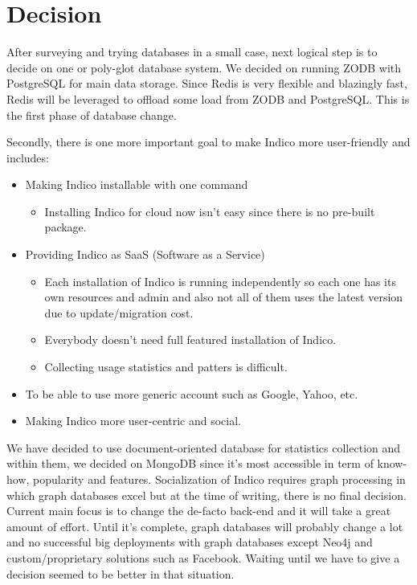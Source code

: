\chapter{Decision}

After surveying and trying databases in a small case, next logical step is to decide on one or poly-glot database system. We decided on running ZODB with PostgreSQL for main data storage. Since Redis is very flexible and blazingly fast, Redis will be leveraged to offload some load from ZODB and PostgreSQL. This is the first phase of database change.

Secondly, there is one more important goal to make Indico more user-friendly and includes:
\begin{itemize}
  \item Making Indico installable with one command
  \begin{itemize}
    \item Installing Indico for cloud now isn't easy since there is no pre-built package.
  \end{itemize}
  \item Providing Indico as SaaS (Software as a Service)
  \begin{itemize}
    \item Each installation of Indico is running independently so each one has its own resources and admin and also not all of them uses the latest version due to update/migration cost.
    \item Everybody doesn't need full featured installation of Indico.
    \item Collecting usage statistics and patters is difficult.
  \end{itemize}
  \item To be able to use more generic account such as Google, Yahoo, etc.
  \item Making Indico more user-centric and social.
\end{itemize}

We have decided to use document-oriented database for statistics collection and within them, we decided on MongoDB since it's most accessible in term of know-how, popularity and features. Socialization of Indico requires graph processing in which graph databases excel but at the time of writing, there is no final decision. Current main focus is to change the de-facto back-end and it will take a great amount of effort. Until it's complete, graph databases will probably change a lot and no successful big deployments with graph databases except Neo4j and custom/proprietary solutions such as Facebook. Waiting until we have to give a decision seemed to be better in that situation.

